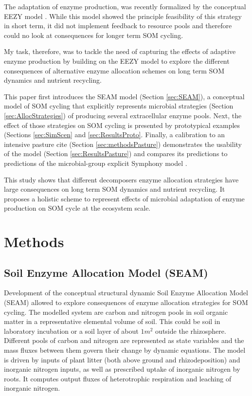 The adaptation of enzyme production, was recently
formalized by the conceptual EEZY model \citep{Moorhead12}. While this model
showed the principle feasibility of this strategy in short term, it did not
implement feedback to resource pools and therefore could no look at
consequences for longer term SOM cycling. 

My task, therefore, was to tackle the need of capturing the effects of adaptive
enzyme production by building on the EEZY model to explore the different
consequences of alternative enzyme allocation schemes on long term SOM dynamics
and nutrient recycling.

This paper first introduces the SEAM model (Section \ref{sec:SEAM}), a
conceptual model of SOM cycling that explicitly represents microbial strategies
(Section \ref{sec:AllocStrategies}) of producing several extracellular enzyme
pools.
Next, the effect of those strategies on SOM cycling is presented by prototypical
examples (Sections \ref{sec:SimScen} and \ref{sec:ResultsProto}. Finally, a
calibration to an intensive pasture cite (Section
\ref{sec:methodsPasture}) demonstrates the usability of the model
(Section \ref{sec:ResultsPasture}) and compares its predictions to predictions
of the microbial-group explicit Symphony model \citep{Perveen14}.

This study shows that different decomposers enzyme allocation strategies
have large consequences on long term SOM dynamics and nutrient recycling. It
proposes a holistic scheme to represent effects of microbial adaptation of
enzyme production on SOM cycle at the ecosystem scale.

\section{Methods}
\subsection{Soil Enzyme Allocation Model (SEAM)
\label{sec:SEAM}}
Development of the conceptual structural dynamic Soil Enzyme Allocation Model
(SEAM) allowed to explore consequences of enzyme
allocation strategies for SOM cycling. The
modelled system are carbon and nitrogen pools in soil organic matter in
a representative elemental volume of soil. This could be soil in laboratory
incubation or a soil layer of about $1 \unit{m^2}$ outside the rhizosphere.
Different pools of carbon and nitrogen are represented as state variables and the mass
fluxes between them govern their change by dynamic equations. The model is
driven by inputs of plant litter (both above ground and rhizodeposition) and
inorganic nitrogen inputs, as well as prescribed uptake of inorganic nitrogen
by roots. It computes output fluxes of heterotrophic respiration and
leaching of inorganic nitrogen.

